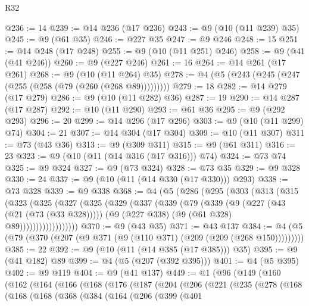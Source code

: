 \begin{lexlean}{R32}
\begin{coremodule}
{{{{{{{{{{{{{{{{{{{{{{{{{{{{{{{{{{{{{{{{{{{{{{{{{{{@236 := 14
@239 := @14 @236 (@17 @236)
@243 := @9 (@10 (@11 @239) @35)
@245 := @9 (@61 @35)
@246 := @227 @35
@247 := @9 @246
@248 := 15
@251 := @14 @248 (@17 @248)
@255 := @9 (@10 (@11 @251) @246)
@258 := @9 (@41 (@41 @246))
@260 := @9 (@227 @246)
@261 := 16
@264 := @14 @261 (@17 @261)
@268 := @9 (@10 (@11 @264) @35)
@278 := @4 (@5 (@243 (@245 (@247 (@255 (@258 (@79 (@260 (@268 @89)))))))))
@279 := 18
@282 := @14 @279 (@17 @279)
@286 := @9 (@10 (@11 @282) @36)
@287 := 19
@290 := @14 @287 (@17 @287)
@292 := @10 (@11 @290)
@293 := @61 @36
@295 := @9 (@292 @293)
@296 := 20
@299 := @14 @296 (@17 @296)
@303 := @9 (@10 (@11 @299) @74)
@304 := 21
@307 := @14 @304 (@17 @304)
@309 := @10 (@11 @307)
@311 := @73 (@43 @36)
@313 := @9 (@309 @311)
@315 := @9 (@61 @311)
@316 := 23
@323 := @9 (@10 (@11 (@14 @316 (@17 @316))) @74)
@324 := @73 @74
@325 := @9 @324
@327 := @9 (@73 @324)
@328 := @73 @35
@329 := @9 @328
@330 := 24
@337 := @9 (@10 (@11 (@14 @330 (@17 @330))) @293)
@338 := @73 @328
@339 := @9 @338
@368 := @4
    (@5
      (@286
        (@295
          (@303
            (@313
              (@315
                (@323
                  (@325
                    (@327
                      (@325
                        (@329
                          (@337
                            (@339
                              (@79
                                (@339
                                  (@9
                                    (@227 (@43 (@21 (@73 (@33 @328)))))
                                    (@9 (@227 @338) (@9 (@61 @328) @89))))))))))))))))))
@370 := @9 (@43 @35)
@371 := @43 @137
@384 := @4 (@5 (@79 (@370 (@207 (@9 @371 (@9 (@110 @371) (@209 (@209 (@268 @150)))))))))
@385 := 22
@392 := @9 (@10 (@11 (@14 @385 (@17 @385))) @35)
@395 := @9 (@41 @182) @89
@399 := @4 (@5 (@207 (@392 @395)))
@401 := @4 (@5 @395)
@402 := @9 @119
@404 := @9 (@41 @137)
@449 := @1
    (@96
      (@149
        (@160
          (@162
            (@164
              (@166
                (@168
                  (@176
                    (@187
                      (@204
                        (@206
                          (@221
                            (@235
                              (@278
                                (@168
                                  (@168
                                    (@168
                                      (@368
                                        (@384
                                          (@164
                                            (@206
                                              (@399
                                                (@401
}}}}}}}}}}}}}}}}}}}}}}}}}}}}}}}}}}}}}}}}}}}}}}}}}}}
\end{coremodule}
\end{lexlean}
